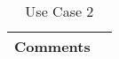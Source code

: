 \begin{table}[H]
\begin{tabular}[t]{ | >{\bfseries}l | p{9.5cm} |}
    Comments &
        \\ \hline

    \end{tabular}
  \caption{Use Case 2}
  \label{fig:uc_2}
\end{table}
